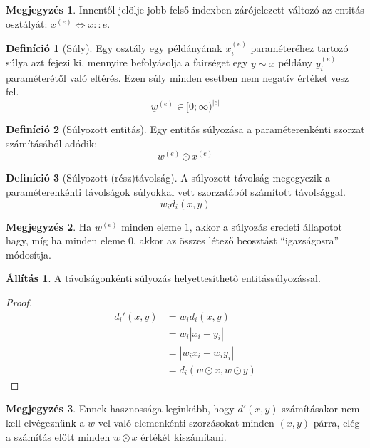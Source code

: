 \documentclass[twocolumn]{article}
\theoremstyle{definition}
\newtheorem{definition}{Definíció}[section]
\newtheorem{allitas}{Állítás}[section]
\newtheorem*{megj}{Megjegyzés}
\newcommand{\vect}[1]{ \underline{#1} }
\newcommand{\ent}[2]{ {#1}^{(#2)} }
\begin{document}
    \begin{megj}
        Innentől jelölje jobb felső indexben zárójelezett változó az entitás osztályát: $x^{(e)} \Leftrightarrow x::e$.
    \end{megj}
    
    \begin{definition}[Súly]
        Egy osztály egy példányának $\ent{x}{e}_i$ paraméteréhez tartozó súlya azt fejezi ki, mennyire befolyásolja a fairséget egy $y\sim x$ példány $\ent{y}{e}_i$ paraméterétől való eltérés. 
        Ezen súly minden esetben nem negatív értéket vesz fel.
        \begin{equation}
            \ent{\vect w}{e} \in [0;\infty)^{|e|}
        \end{equation}
    \end{definition}
    
    \begin{definition}[Súlyozott entitás]
        Egy entitás súlyozása a paraméterenkénti szorzat számításából adódik:
        \begin{equation}
            \ent w e \odot \ent x e
        \end{equation}
    \end{definition}
    
    \begin{definition}[Súlyozott (rész)távolság]
        A súlyozott távolság megegyezik a paraméterenkénti távolságok súlyokkal vett szorzatából számított távolsággal.
        \begin{equation*}
            w_i d_i(x, y)
        \end{equation*}
    \end{definition}
    
    \begin{megj}
        Ha $\ent w e$ minden eleme $1$, akkor a súlyozás eredeti állapotot hagy, míg ha minden eleme $0$, akkor az összes létező beosztást \enquote{igazságosra} módosítja.
    \end{megj}
    
    \begin{allitas}
        A távolságonkénti súlyozás helyettesíthető entitássúlyozással.
        \begin{proof}
            \begin{equation}
            \begin{split}
                d_i'(x, y) &= w_i d_i(x, y) \\
                &= w_i |x_i - y_i| \\
                &= |w_i x_i - w_i y_i| \\
                &= d_i(w \odot x, w \odot y)
            \end{split}
            \end{equation}
        \end{proof}
        \begin{megj}
            Ennek hasznossága leginkább, hogy $d'(x, y)$ számításakor nem kell elvégeznünk a $w$-vel való elemenkénti szorzásokat minden $(x,y)$ párra, elég a számítás előtt minden $ w \odot x $ értékét kiszámítani.
        \end{megj}
    \end{allitas}
    
\end{document}
